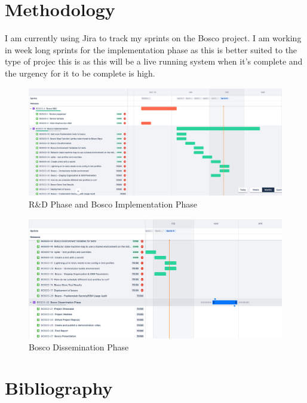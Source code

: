 \documentclass[12pt,a4paper,titlepage]{report}
\begin{document}
\appendix
\chapter{Methodology}
I am currently using Jira to track my sprints on the Bosco project. I am working in week long sprints for the implementation phase as this
is better suited to the type of projec this is as this will be a live running system when it's complete and the urgency for it to be complete is high.

\begin{figure}[h]
  \centering
  \includegraphics[width=15cm]{./diagrams/sprints1.png}
  \caption{R\&D Phase and Bosco Implementation Phase}
\end{figure}

\begin{figure}[h]
  \centering
  \includegraphics[width=15cm]{./diagrams/sprints2.png}
  \caption{Bosco Dissemination Phase}
\end{figure}


\chapter{Bibliography}
\end{document}
